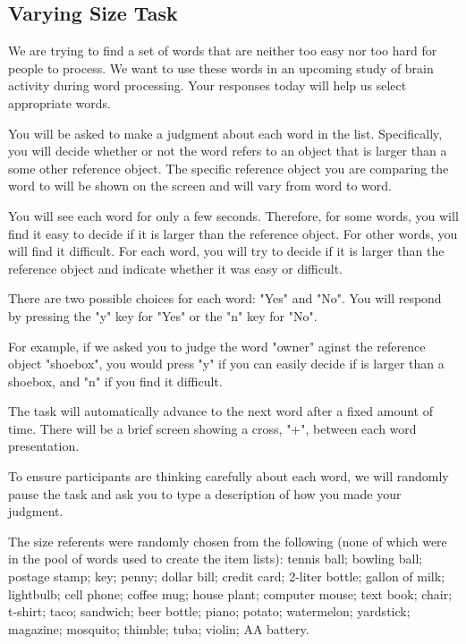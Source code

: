 \documentclass[man,natbib,floatsintext]{apa6} %
\begin{document}
\subsection{Varying Size Task}
\begin{displayquote}
We are trying to find a set of words that are neither too easy nor too hard for people to process. We want to use these words in an upcoming study of brain activity during word processing. Your responses today will help us select appropriate words.

       You will be asked to make a judgment about each word in the list.
       Specifically, you will decide whether or not the word refers to an object that is larger than a some other reference object.
           The specific reference object you are comparing the word to will be shown on the screen and will vary from word to word.

       You will see each word for only a few seconds. Therefore, for some words, you will find it easy to
           decide if it is larger than the reference object. For other words, you will find it difficult.
           For each word, you will try to decide if it is larger than the reference object and indicate whether it was easy or difficult.

      There are two possible choices for each word: "Yes" and "No". You will respond by pressing
      the "y" key for "Yes" or the "n" key for "No".

      For example, if we asked you to judge the word "owner" aginst the reference object "shoebox", you would press "y" if you can easily decide
          if is larger than a shoebox, and "n" if you find it difficult.

      The task will automatically advance to the next word after a fixed amount of time.
      There will be a brief screen showing a cross, "+", between each word presentation.

      To ensure participants are thinking carefully about each word, we will
          randomly pause the task and ask you to type a description of how you made your judgment.
\end{displayquote}
The size referents were randomly chosen from the following (none of which were in the pool of words used to create the item lists):
tennis ball; bowling ball; postage stamp; key; penny; dollar bill; credit card; 2-liter bottle; gallon of milk; lightbulb; cell phone; coffee mug; house plant; computer mouse; text book; chair; t-shirt; taco; sandwich; beer bottle; piano; potato; watermelon; yardstick; magazine; mosquito; thimble; tuba; violin; AA battery.
\end{document}

